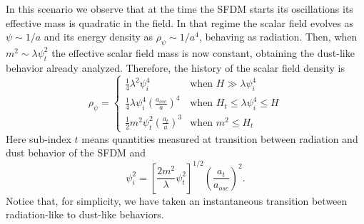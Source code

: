 \documentclass[amssymb,twocolumn,prd,nofootinbib,showpacs]{revtex4-1}
\begin{document}
\begin{itemize}
In this scenario we observe that at the time the SFDM starts its oscillations its effective mass is quadratic in the field. 
In that regime the scalar field evolves as $\psi\sim 1/a$ and its energy density as $\rho_{\psi}\sim 1/a^4$, behaving as radiation. 
Then, when $m^2 \sim \lambda\psi_t^2$ the effective scalar field mass is now constant, 
obtaining the dust-like behavior already analyzed. 
Therefore, the history of the scalar field density is
%
\begin{equation}\label{rhosfdmlam}
\rho_\psi = \left\lbrace\begin{array}{ll}
\frac{1}{4}\lambda^2\psi_i^4 & \text{when }H\gg \lambda\psi_i^4 \\
\frac{1}{4}\lambda\psi_i^4\left(\frac{a_{osc}}{a}\right)^4 & \text{when }H_t\leq \lambda\psi_i^4\leq H\\
\frac{1}{2}m^2\psi_t^2\left(\frac{a_t}{a}\right)^3 & \text{when } m^2\leq H_t
\end{array}\right .
\end{equation}
%
Here sub-index $t$ means quantities measured at transition between radiation and dust behavior of the SFDM and
\begin{equation}\label{inilamb}
\psi_i^2=\left[\frac{2m^2}{\lambda}\psi_t^2\right]^{1/2}\left(\frac{a_t}{a_{osc}}\right)^2.
\end{equation}
%
Notice that, for simplicity, we have taken an instantaneous transition between radiation-like to dust-like behaviors. 


\end{itemize}
\end{document}

